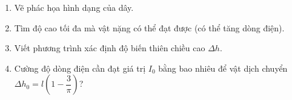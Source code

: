\begin{vd}
\begin{center}
    \end{center}
    \begin{enumerate}[1)]
        \item Vẽ phác họa hình dạng của dây.
        \item Tìm độ cao tối đa mà vật nặng có thể đạt được (có thể tăng dòng điện).
        \item Viết phương trình xác định độ biến thiên chiều cao $\Delta h$.
        \item Cường độ dòng điện cần đạt giá trị $I_0$ bằng bao nhiêu để vật dịch chuyển $\Delta h_0= l\left(1-\dfrac{3}{\pi}\right)$?
    \end{enumerate}
\end{vd}
